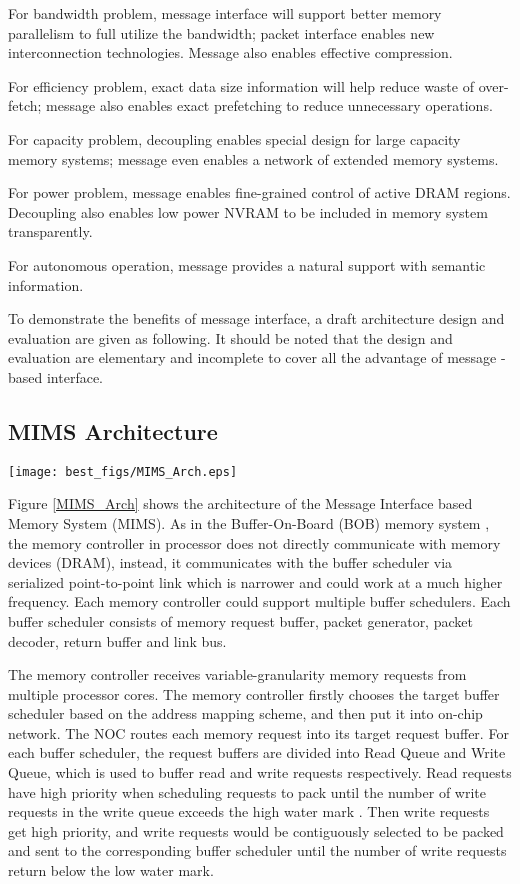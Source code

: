 \documentclass[pageno]{jpaper}
\begin{document}
For bandwidth problem, message interface will support better memory parallelism to full utilize the bandwidth; packet interface enables new interconnection technologies. Message also enables effective compression.

For efficiency problem, exact data size information will help reduce waste of over-fetch; message also enables exact prefetching to reduce unnecessary operations.

For capacity problem, decoupling enables special design for large capacity
memory systems; message even enables a network of extended memory systems.

For power problem, message enables fine-grained control of active DRAM regions. Decoupling also enables low power NVRAM to be included in memory system transparently.

For autonomous operation, message provides a natural support with semantic information.

To demonstrate the benefits of message interface, a draft architecture design  and  evaluation are given as following. It should be noted that the design and evaluation are elementary and incomplete to cover all the advantage of message -based interface.

\subsection {MIMS Architecture}

\begin{figure*}
  \centering
  \texttt{[image: best\_figs/MIMS\_Arch.eps]}
  \caption{The Message Interface Memory System architecture.}
  \label{MIMS_Arch}
\end{figure*}

Figure \ref{MIMS_Arch} shows the architecture of the Message Interface based  Memory System (MIMS). As in the Buffer-On-Board (BOB) memory system \cite{BOBMemory}, the memory controller in processor does not directly communicate with memory devices (DRAM), instead, it communicates with the buffer scheduler via serialized point-to-point link which is narrower and could work at a much higher frequency. Each memory controller could support multiple buffer schedulers. Each buffer scheduler consists of memory request buffer, packet generator, packet decoder, return buffer and link bus.

The memory controller receives variable-granularity memory requests from multiple processor cores. The memory controller firstly chooses the target buffer scheduler based on the address mapping scheme, and then put it into on-chip network. The NOC routes each memory request into its target request buffer. For each buffer scheduler, the request buffers are divided into Read Queue and Write Queue, which is used to buffer read and write requests respectively. Read requests have high priority when scheduling requests to pack until the number of write requests in the write queue exceeds the high water mark \cite{VirtualWriteQueue,StageReads}. Then write requests get high priority, and write requests would be contiguously selected to be packed and sent to the corresponding buffer scheduler until the number of write requests return below the low water mark.
\end{document}
